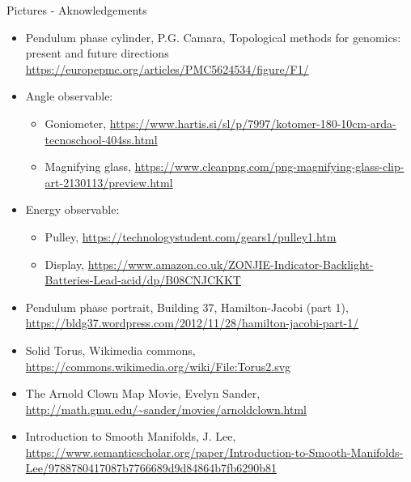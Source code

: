 \documentclass[beamer,handout,10pt]{standalone}
\begin{document}
\begin{frame}[t,allowframebreaks]{Pictures - Aknowledgements}
\begin{itemize}
		\item Pendulum phase cylinder, P.G. Camara, Topological methods for genomics: present and future directions
			\url{https://europepmc.org/articles/PMC5624534/figure/F1/}
		
		\item Angle observable:
			\begin{itemize}
				\item Goniometer,
					\url{https://www.hartis.si/sl/p/7997/kotomer-180-10cm-arda-tecnoschool-404ss.html}
				\item Magnifying glass,
					\url{https://www.cleanpng.com/png-magnifying-glass-clip-art-2130113/preview.html}
			\end{itemize}					
		\item Energy observable:
			\begin{itemize}
				\item Pulley,
					\url{https://technologystudent.com/gears1/pulley1.htm}
				\item Display,
					\url{https://www.amazon.co.uk/ZONJIE-Indicator-Backlight-Batteries-Lead-acid/dp/B08CNJCKKT}
			\end{itemize}
		\item Pendulum phase portrait, Building 37, Hamilton-Jacobi (part 1),
			\url{https://bldg37.wordpress.com/2012/11/28/hamilton-jacobi-part-1/}
			
		\item Solid Torus, Wikimedia commons,
			\url{https://commons.wikimedia.org/wiki/File:Torus2.svg}
		\item The Arnold Clown Map Movie, Evelyn Sander,
			\url{http://math.gmu.edu/~sander/movies/arnoldclown.html}
			
		\item Introduction to Smooth Manifolds, J. Lee,
			\url{https://www.semanticscholar.org/paper/Introduction-to-Smooth-Manifolds-Lee/9788780417087b7766689d9d84864b7fb6290b81}			
			
	\end{itemize}
\end{frame}
\note[itemize]{
	\item
}



\end{document}
